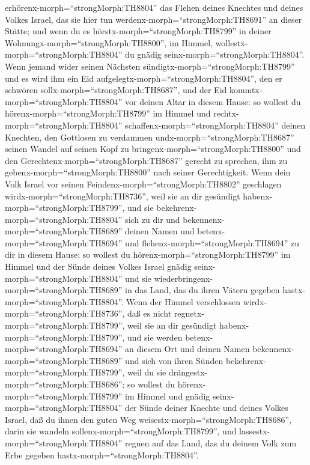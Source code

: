 erhörenx-morph=``strongMorph:TH8804'' das Flehen deines Knechtes und
deines Volkes Israel, das sie hier tun
werdenx-morph=``strongMorph:TH8691'' an dieser Stätte; und wenn du es
hörstx-morph=``strongMorph:TH8799'' in deiner
Wohnungx-morph=``strongMorph:TH8800'', im Himmel,
wollestx-morph=``strongMorph:TH8804'' du gnädig
seinx-morph=``strongMorph:TH8804''.  Wenn jemand wider
seinen Nächsten sündigtx-morph=``strongMorph:TH8799'' und es wird ihm
ein Eid aufgelegtx-morph=``strongMorph:TH8804'', den er schwören
sollx-morph=``strongMorph:TH8687'', und der Eid
kommtx-morph=``strongMorph:TH8804'' vor deinen Altar in diesem Hause:
 so wollest du hörenx-morph=``strongMorph:TH8799'' im
Himmel und rechtx-morph=``strongMorph:TH8804''
schaffenx-morph=``strongMorph:TH8804'' deinen Knechten, den Gottlosen zu
verdammen undx-morph=``strongMorph:TH8687'' seinen Wandel auf seinen
Kopf zu bringenx-morph=``strongMorph:TH8800'' und den
Gerechtenx-morph=``strongMorph:TH8687'' gerecht zu sprechen, ihm zu
gebenx-morph=``strongMorph:TH8800'' nach seiner Gerechtigkeit.
 Wenn dein Volk Israel vor seinen
Feindenx-morph=``strongMorph:TH8802'' geschlagen
wirdx-morph=``strongMorph:TH8736'', weil sie an dir gesündigt
habenx-morph=``strongMorph:TH8799'', und sie
bekehrenx-morph=``strongMorph:TH8804'' sich zu dir und
bekennenx-morph=``strongMorph:TH8689'' deinen Namen und
betenx-morph=``strongMorph:TH8694'' und
flehenx-morph=``strongMorph:TH8694'' zu dir in diesem Hause:
 so wollest du hörenx-morph=``strongMorph:TH8799'' im
Himmel und der Sünde deines Volkes Israel gnädig
seinx-morph=``strongMorph:TH8804'' und sie
wiederbringenx-morph=``strongMorph:TH8689'' in das Land, das du ihren
Vätern gegeben hastx-morph=``strongMorph:TH8804''.  Wenn
der Himmel verschlossen wirdx-morph=``strongMorph:TH8736'', daß es nicht
regnetx-morph=``strongMorph:TH8799'', weil sie an dir gesündigt
habenx-morph=``strongMorph:TH8799'', und sie werden
betenx-morph=``strongMorph:TH8694'' an diesem Ort und deinen Namen
bekennenx-morph=``strongMorph:TH8689'' und sich von ihren Sünden
bekehrenx-morph=``strongMorph:TH8799'', weil du sie
drängestx-morph=``strongMorph:TH8686'';  so wollest du
hörenx-morph=``strongMorph:TH8799'' im Himmel und gnädig
seinx-morph=``strongMorph:TH8804'' der Sünde deiner Knechte und deines
Volkes Israel, daß du ihnen den guten Weg
weisestx-morph=``strongMorph:TH8686'', darin sie wandeln
sollenx-morph=``strongMorph:TH8799'', und
lassestx-morph=``strongMorph:TH8804'' regnen auf das Land, das du deinem
Volk zum Erbe gegeben hastx-morph=``strongMorph:TH8804''. 

